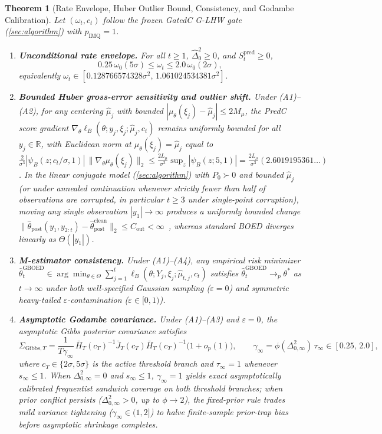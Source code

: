 \documentclass[11pt,a4paper,reqno]{amsart}
\newtheorem{theorem}{Theorem}[section]
\theoremstyle{definition}
\theoremstyle{remark}
\newcommand{\R}{\mathbb{R}}
\begin{document}
\begin{theorem}[Rate Envelope, Huber Outlier Bound, Consistency, and Godambe Calibration]\label{thm:gatedc_guarantees}
Let $(\omega_t, c_t)$ follow the frozen GatedC G-LHW gate (\cref{sec:algorithm}) with $p_{\mathrm{IMQ}} = 1$.
\begin{enumerate}[label=(\alph*)]
\item \textbf{Unconditional rate envelope.} For all $t \ge 1$, $\hat{\Delta}_0^2 \ge 0$, and $S_t^{\mathrm{pred}} \ge 0$,
\[
0.25\,\omega_0(5\sigma) \le \omega_t \le 2.0\,\omega_0(2\sigma),
\]
equivalently $\omega_t \in [0.128766574328\sigma^2,\, 1.061024534381\sigma^2]$.
\item \textbf{Bounded Huber gross-error sensitivity and outlier shift.} Under (A1)--(A2), for any centering $\hat{\mu}_j$ with bounded $|\mu_\theta(\xi_j) - \hat{\mu}_j| \le 2M_\mu$, the PredC score gradient $\nabla_\theta \ell_B(\theta; y_j, \xi_j; \hat{\mu}_j, c_t)$ remains uniformly bounded for all $y_j \in \R$, with Euclidean norm at $\mu_\theta(\xi_j) = \hat{\mu}_j$ equal to $\frac{2}{\sigma^3}|\psi_B(z; c_t/\sigma, 1)|\,\|\nabla_\theta \mu_\theta(\xi_j)\|_2 \le \frac{2 L_\mu}{\sigma^3}\sup_z|\psi_B(z; 5, 1)| = \frac{2 L_\mu}{\sigma^3}(2.6019195361\dots)$. In the linear conjugate model (\cref{sec:algorithm}) with $P_0 \succ 0$ and bounded $\hat{\mu}_j$ (or under annealed continuation whenever strictly fewer than half of observations are corrupted, in particular $t \ge 3$ under single-point corruption), moving any single observation $|y_1| \to \infty$ produces a uniformly bounded change $\|\hat{\theta}_{\mathrm{post}}(y_1, y_{2:t}) - \hat{\theta}_{\mathrm{post}}^{\mathrm{clean}}\|_2 \le C_{\mathrm{out}} < \infty$~\cite{huber1964robust}, whereas standard BOED diverges linearly as $\Theta(|y_1|)$.
\item \textbf{M-estimator consistency.} Under (A1)--(A4), any empirical risk minimizer $\hat{\theta}_t^{\mathrm{GBOED}} \in \arg\min_{\theta \in \Theta} \sum_{j=1}^t \ell_B(\theta; Y_j, \xi_j; \hat{\mu}_{t,j}, c_t)$ satisfies $\hat{\theta}_t^{\mathrm{GBOED}} \to_p \theta^*$ as $t \to \infty$ under both well-specified Gaussian sampling ($\varepsilon = 0$) and symmetric heavy-tailed $\varepsilon$-contamination ($\varepsilon \in [0, 1)$).
\item \textbf{Asymptotic Godambe covariance.} Under (A1)--(A3) and $\varepsilon = 0$, the asymptotic Gibbs posterior covariance satisfies
\[
\Sigma_{\mathrm{Gibbs}, T} = \frac{1}{T \gamma_\infty}\,\bar{H}_T(c_T)^{-1}\bar{J}_T(c_T)\bar{H}_T(c_T)^{-1}\bigl(1 + o_p(1)\bigr), \qquad
\gamma_\infty = \phi(\Delta_{0,\infty}^2)\,\tau_\infty \in [0.25,\, 2.0],
\]
where $c_T \in \{2\sigma, 5\sigma\}$ is the active threshold branch and $\tau_\infty = 1$ whenever $s_\infty \le 1$. When $\Delta_{0,\infty}^2 = 0$ and $s_\infty \le 1$, $\gamma_\infty = 1$ yields exact asymptotically calibrated frequentist sandwich coverage on both threshold branches; when prior conflict persists ($\Delta_{0,\infty}^2 > 0$, up to $\phi \to 2$), the fixed-prior rule trades mild variance tightening ($\gamma_\infty \in (1, 2]$) to halve finite-sample prior-trap bias before asymptotic shrinkage completes.
\end{enumerate}
\end{theorem}
\end{document}
